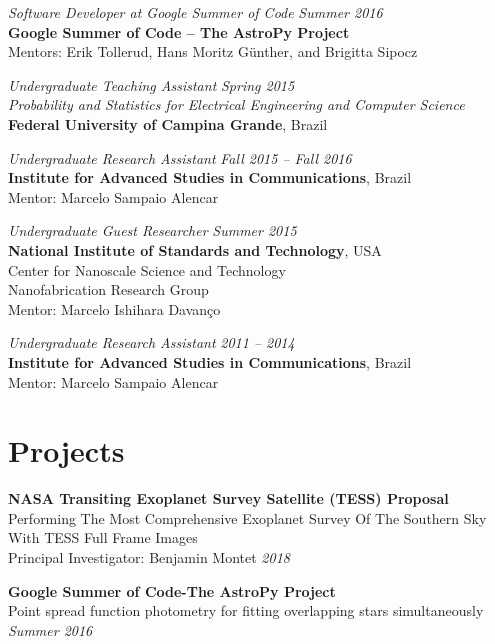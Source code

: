 \documentclass[10pt]{article}
\begin{document}
\begin{titlepage}
\emph{Software Developer at Google Summer of Code} \hfill \textit{Summer 2016}
\\\textbf{Google Summer of Code -- The AstroPy Project}
\\Mentors: Erik Tollerud, Hans Moritz G\"unther, and Brigitta Sipocz
\vspace{.5cm}

\emph{Undergraduate Teaching Assistant} \hfill \textit{Spring 2015}
\\\emph{Probability and Statistics for Electrical Engineering and Computer Science}
\\\textbf{Federal University of Campina Grande}, Brazil
\vspace{.5cm}

\emph{Undergraduate Research Assistant} \hfill \textit{Fall 2015 -- Fall 2016}
\\\textbf{Institute for Advanced Studies in Communications}, Brazil
\\Mentor: Marcelo Sampaio Alencar
\vspace{.5cm}

\emph{Undergraduate Guest Researcher} \hfill \textit{Summer 2015}
\\\textbf{National Institute of Standards and Technology}, USA
\\Center for Nanoscale Science and Technology
\\Nanofabrication Research Group
\\Mentor: Marcelo Ishihara Davan\c co
\vspace{.5cm}

\emph{Undergraduate Research Assistant} \hfill \textit{2011 -- 2014}
\\\textbf{Institute for Advanced Studies in Communications}, Brazil
\\Mentor: Marcelo Sampaio Alencar

\section*{Projects}
    \textbf{NASA Transiting Exoplanet Survey Satellite (TESS) Proposal}\\
    Performing The Most Comprehensive Exoplanet Survey Of The Southern Sky With TESS Full Frame Images\\
    Principal Investigator: Benjamin Montet
    \hfill \textit{2018}
    \vspace{.5cm}


    \textbf{Google Summer of Code-The AstroPy Project}\\
    Point spread function photometry for fitting overlapping stars simultaneously
    \hfill \textit{Summer 2016}
    \vspace{.5cm}


\end{titlepage}
\end{document}
